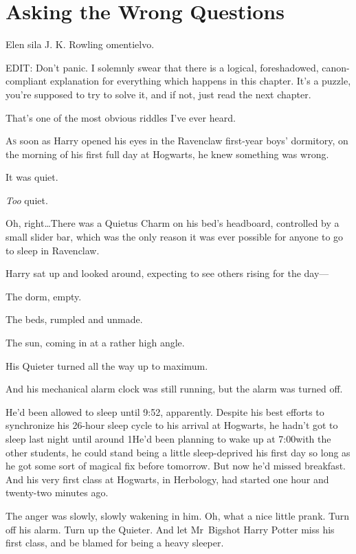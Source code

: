 \chapter{Asking the Wrong Questions}

\begin{chapterOpeningAuthorNote}
Elen sila J. K. Rowling omentielvo.

EDIT: Don't panic. I solemnly swear that there is a logical, foreshadowed, canon-compliant explanation for everything which happens in this chapter. It's a puzzle, you're supposed to try to solve it, and if not, just read the next chapter.
\end{chapterOpeningAuthorNote}
\begin{chapterOpeningQuote}
That's one of the most obvious riddles I've ever heard.
\end{chapterOpeningQuote}

\lettrine{A}{s} soon as Harry opened his eyes in the Ravenclaw first-year boys’ dormitory, on the morning of his first full day at Hogwarts, he knew something was wrong.

It was quiet.

\emph{Too} quiet.

Oh, right…There was a Quietus Charm on his bed’s headboard, controlled by a small slider bar, which was the only reason it was ever possible for anyone to go to sleep in Ravenclaw.

Harry sat up and looked around, expecting to see others rising for the day—

The dorm, empty.

The beds, rumpled and unmade.

The sun, coming in at a rather high angle.

His Quieter turned all the way up to maximum.

And his mechanical alarm clock was still running, but the alarm was turned off.

He’d been allowed to sleep until 9:52\am, apparently. Despite his best efforts to synchronize his 26-hour sleep cycle to his arrival at Hogwarts, he hadn’t got to sleep last night until around 1\am He’d been planning to wake up at 7:00\am with the other students, he could stand being a little sleep-deprived his first day so long as he got some sort of magical fix before tomorrow. But now he’d missed breakfast. And his very first class at Hogwarts, in Herbology, had started one hour and twenty-two minutes ago.

The anger was slowly, slowly wakening in him. Oh, what a nice little prank. Turn off his alarm. Turn up the Quieter. And let Mr~Bigshot Harry Potter miss his first class, and be blamed for being a heavy sleeper.

